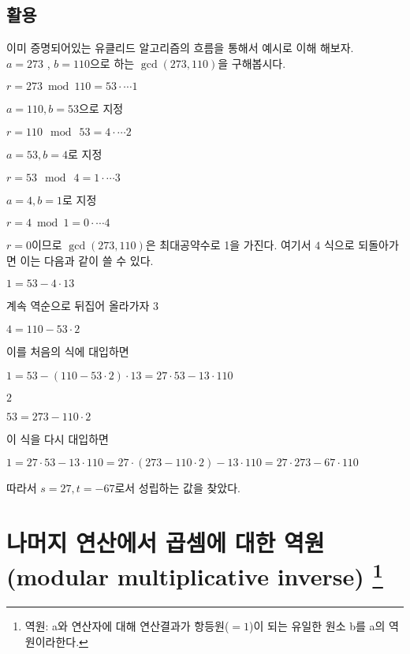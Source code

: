 \subsection{활용}
이미 증명되어있는 유클리드 알고리즘의 흐름을 통해서 예시로 이해 해보자.\\
$a=273$  , $b=110$으로 하는 $\gcd(273,110)$을 구해봅시다.
\begin{center}
    $r= 273\bmod  110 = 53 \cdot\cdots \mathit{1}$
\end{center}
$a=110 , b=53$으로 지정
\begin{center}
    $r= 110\:\bmod \: 53 = 4\cdot\cdots \mathit{2}$
\end{center}
$a=53 , b=4$로 지정
\begin{center}
    $r= 53\:\bmod \: 4 = 1 \cdot\cdots \mathit{3}$
\end{center}
$a=4 , b=1$로 지정
\begin{center}
    $r= 4\bmod  1 = 0\cdot\cdots \mathit{4}$
\end{center}
$r=0$이므로 $\gcd(273,110)$은 최대공약수로 1을 가진다.
여기서 $\mathit{4}$ 식으로 되돌아가면 이는 다음과 같이 쓸 수 있다.
\begin{center}
    $1=53 - 4\cdot13$
\end{center}
계속 역순으로 뒤집어 올라가자 $\mathit{3}$
\begin{center}
    $4=110 - 53\cdot2$
\end{center}
이를 처음의 식에 대입하면
\begin{center}
    $1=53 - (110 - 53\cdot2)\cdot13 =27\cdot53-13\cdot110 $
\end{center}
$\mathit{2}$
\begin{center}
    $53=273 - 110\cdot2$
\end{center}
이 식을 다시 대입하면
\begin{center}
    $1=27\cdot53-13\cdot110=27\cdot(273 - 110\cdot2)-13\cdot110=27\cdot273-67\cdot 110$
\end{center}
따라서 $s=27, t=-67$로서 성립하는 값을 찾았다.

\section{나머지 연산에서 곱셈에 대한 역원 (modular multiplicative inverse)
\protect\footnote{역원: a와 연산자에 대해 연산결과가 항등원($=1$)이 되는 유일한 원소 b를 a의 역원이라한다.}} 

